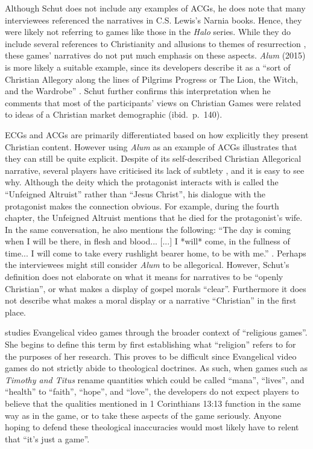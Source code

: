 Although Schut does not include any examples of \acp{ACG}, he does note that many interviewees referenced the narratives in C.S. Lewis's Narnia books. Hence, they were likely not referring to games like those in the \textit{Halo} series. While they do include several references to Christianity and allusions to themes of resurrection \parencite{paulissen_dark_2018}, these games' narratives do not put much emphasis on these aspects. \textit{Alum} (2015) is more likely a suitable example, since its developers describe it as a ``sort of Christian Allegory along the lines of Pilgrims Progress or The Lion, the Witch, and the Wardrobe'' \parencite{crashable_studios_alum_2015}. Schut further confirms this interpretation when he comments that most of the participants' views on Christian Games were related to ideas of a Christian market demographic (ibid.~p.~140).

\acp{ECG} and \acp{ACG} are primarily differentiated based on how explicitly they present Christian content. However using \textit{Alum} as an example of \acp{ACG} illustrates that they can still be quite explicit. Despite of its self-described Christian Allegorical narrative, several players have criticised its lack of subtlety \parencite {arkane_review_2015, baxted_review_2015, virotti_review_2017}, and it is easy to see why. Although the deity which the protagonist interacts with is called the ``Unfeigned Altruist'' rather than ``Jesus Christ'', his dialogue with the protagonist makes the connection obvious. For example, during the fourth chapter, the Unfeigned Altruist mentions that he died for the protagonist's wife. In the same conversation, he also mentions the following: ``The day is coming when I will be there, in flesh and blood... [...] I *will* come, in the fullness of time... I will come to take every rushlight bearer home, to be with me.'' \parencite[10:04]{123pazu_alum_2015}. Perhaps the interviewees might still consider \textit{Alum} to be allegorical. However, Schut's definition does not elaborate on what it means for narratives to be ``openly Christian'', or what makes a display of gospel morals ``clear''. Furthermore it does not describe what makes a moral display or a narrative ``Christian'' in the first place.

\textcite{gonzalez_born-again_2014} studies Evangelical video games through the broader context of ``religious games''. She begins to define this term by first establishing what ``religion'' refers to for the purposes of her research. This proves to be difficult since Evangelical video games do not strictly abide to theological doctrines. As such, when games such as \textit{Timothy and Titus} rename quantities which could be called ``mana'', ``lives'', and ``health'' to ``faith'', ``hope'', and ``love'', the developers do not expect players to believe that the qualities mentioned in 1 Corinthians 13:13 function in the same way as in the game, or to take these aspects of the game seriously. Anyone hoping to defend these theological inaccuracies would most likely have to relent that ``it's just a game''.

